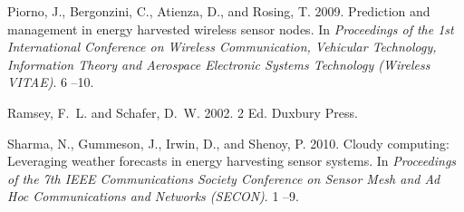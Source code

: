 \documentclass[prodmode,acmtosn]{acmsmall}
\begin{document}
\begin{thebibliography}{}
{\sc Piorno, J.}, {\sc Bergonzini, C.}, {\sc Atienza, D.}, {\sc and} {\sc
  Rosing, T.} 2009.
\newblock Prediction and management in energy harvested wireless sensor nodes.
\newblock In {\em Proceedings of the 1st International Conference on Wireless
  Communication, Vehicular Technology, Information Theory and Aerospace
  Electronic Systems Technology (Wireless VITAE)}. 6 --10.

{\sc Ramsey, F.~L.} {\sc and} {\sc Schafer, D.~W.} 2002.
 2 Ed.
\newblock Duxbury Press.

{\sc Sharma, N.}, {\sc Gummeson, J.}, {\sc Irwin, D.}, {\sc and} {\sc Shenoy,
  P.} 2010.
\newblock Cloudy computing: Leveraging weather forecasts in energy harvesting
  sensor systems.
\newblock In {\em Proceedings of the 7th IEEE Communications Society Conference
  on Sensor Mesh and Ad Hoc Communications and Networks (SECON)}. 1 --9.

\end{thebibliography}
 
\end{document}
